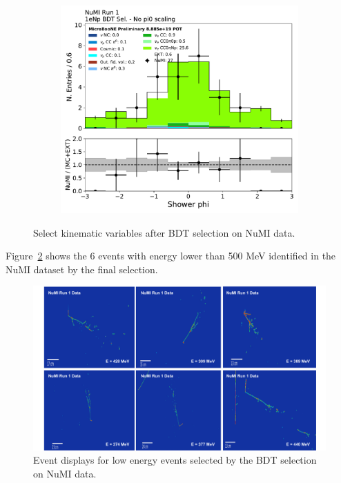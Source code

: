 \begin{figure}[H]
\begin{subfigure}{0.3\textwidth}
    \caption{}
    \end{subfigure}
    \begin{subfigure}{0.3\textwidth}
    \includegraphics[width=1.0\textwidth]{Sidebands/Figures/NuMI/1eNp/BDTSel/shr_phi.pdf}
    \caption{}
    \end{subfigure}
    \caption{Select kinematic variables after \npsel BDT selection on NuMI data.} 
    \label{fig:NuMI_1eNp_10}
\end{figure}

Figure~\ref{fig:Numi1enpEvd} shows the 6 events with energy lower than 500 MeV identified in the NuMI dataset by the \npsel final selection.


\begin{figure}[H]
    \begin{center}
    \includegraphics[width=\textwidth]{Sidebands/Figures/NuMI/1eNp/BDTSel/Evds.pdf}
    \caption{Event displays for low energy events selected by the \npsel BDT selection on NuMI data.}
    \label{fig:Numi1enpEvd}
    \end{center}
\end{figure}

